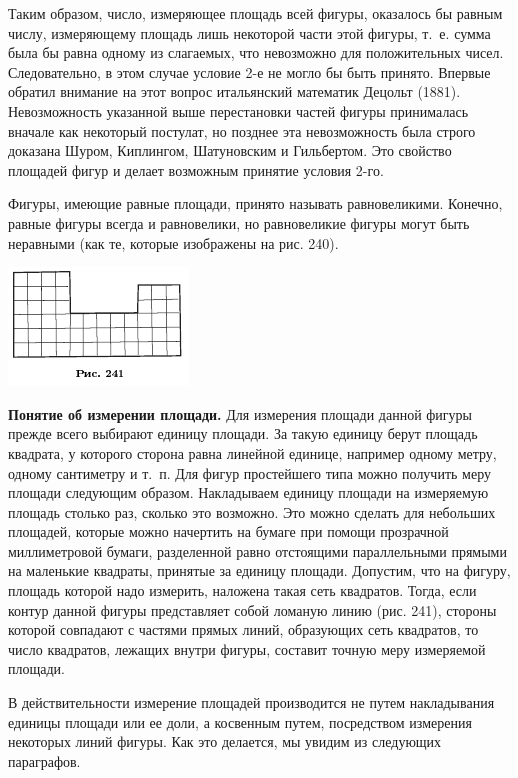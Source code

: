 \documentclass[oneside]{book}
\begin{document}
Таким образом, число, измеряющее площадь всей фигуры, оказалось бы равным числу, измеряющему площадь лишь некоторой части этой фигуры, т.~е. сумма была бы равна одному из слагаемых, что невозможно для положительных чисел.
Следовательно, в этом случае условие 2-е не могло бы быть принято.
Впервые обратил внимание на этот вопрос итальянский математик Децольт (1881).
Невозможность указанной выше перестановки частей фигуры принималась вначале как некоторый постулат, но позднее эта невозможность была строго доказана Шуром, Киплингом, Шатуновским и Гильбертом.
Это свойство площадей фигур и делает возможным принятие условия 2-го. %

Фигуры, имеющие равные площади, принято называть равновеликими.
Конечно, равные фигуры всегда и равновелики, но равновеликие фигуры могут быть неравными (как те, которые изображены на рис. 240).

\includegraphics{pics/ris-241}

\textbf{Понятие об измерении площади.}
Для измерения площади данной фигуры прежде всего выбирают единицу площади.
За такую единицу берут площадь квадрата, у которого сторона равна линейной единице, например одному метру, одному сантиметру и т.~п.
Для фигур простейшего типа можно получить меру площади следующим образом.
Накладываем единицу площади на измеряемую площадь столько раз, сколько это возможно.
Это можно сделать для небольших площадей, которые можно начертить на бумаге при помощи прозрачной миллиметровой бумаги, разделенной равно отстоящими параллельными прямыми на маленькие квадраты, принятые за единицу площади.
Допустим, что на фигуру, площадь которой надо измерить, наложена такая сеть квадратов.
Тогда, если контур данной фигуры представляет собой ломаную линию (рис. 241), стороны которой совпадают с частями прямых линий, образующих сеть квадратов, то число квадратов, лежащих внутри фигуры, составит точную меру измеряемой площади.

В действительности измерение площадей производится не путем накладывания единицы площади или ее доли, а косвенным путем, посредством измерения некоторых линий фигуры.
Как это делается, мы увидим из следующих параграфов.
\end{document}
